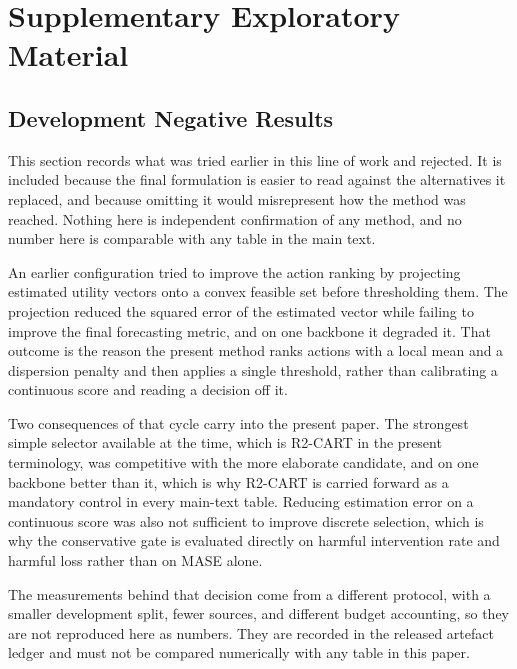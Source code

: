 \documentclass{article}
\begin{document}
\section*{Supplementary Exploratory Material}
\label{app:supplementary}
\subsection{Development Negative Results}
\label{app:development}
This section records what was tried earlier in this line of work and rejected. It is included
because the final formulation is easier to read against the alternatives it replaced, and
because omitting it would misrepresent how the method was reached. Nothing here is independent
confirmation of any method, and no number here is comparable with any table in the main text.

An earlier configuration tried to improve the action ranking by projecting estimated utility
vectors onto a convex feasible set before thresholding them. The projection reduced the squared
error of the estimated vector while failing to improve the final forecasting metric, and on one
backbone it degraded it. That outcome is the reason the present method ranks actions with a
local mean and a dispersion penalty and then applies a single threshold, rather than
calibrating a continuous score and reading a decision off it.

Two consequences of that cycle carry into the present paper. The strongest simple selector
available at the time, which is R2-CART in the present terminology, was competitive with the
more elaborate candidate, and on one backbone better than it, which is why R2-CART is carried
forward as a mandatory control in every main-text table. Reducing estimation error on a
continuous score was also not sufficient to improve discrete selection, which is why the
conservative gate is evaluated directly on harmful intervention rate and harmful loss rather
than on MASE alone.

The measurements behind that decision come from a different protocol, with a smaller
development split, fewer sources, and different budget accounting, so they are not reproduced
here as numbers. They are recorded in the released artefact ledger and must not be compared
numerically with any table in this paper.
\end{document}
